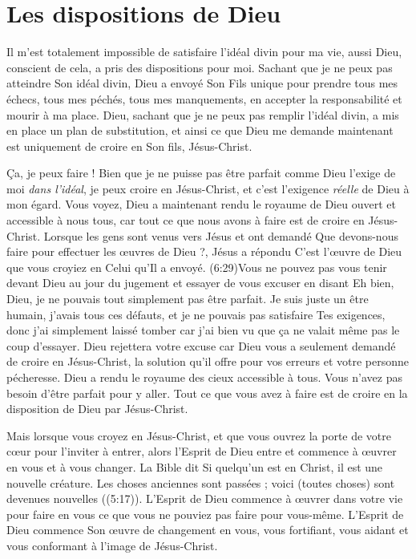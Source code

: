 \section{Les dispositions de Dieu}

Il m'est totalement impossible de satisfaire l'idéal divin
 pour ma vie, aussi Dieu, conscient de cela, a pris
 des dispositions pour moi.
 Sachant que je ne peux pas atteindre Son idéal divin,
 Dieu a envoyé Son Fils unique pour prendre tous mes échecs,
 tous mes péchés, tous mes manquements, en accepter la responsabilité
 et mourir à ma place.
 Dieu, sachant que je ne peux pas remplir l'idéal divin,
 a mis en place un plan de substitution, et ainsi ce que Dieu
 me demande maintenant est uniquement de croire en Son fils, Jésus-Christ.

Ça, je peux faire !
 Bien que je ne puisse pas être parfait
 comme Dieu l'exige de moi \emph{dans l'idéal},
 je peux croire en Jésus-Christ,
 et c'est l'exigence \emph{réelle} de Dieu à mon égard.
 Vous voyez, Dieu a maintenant rendu le royaume de Dieu ouvert
 et accessible à nous tous, car tout ce que nous avons à faire
 est de croire en Jésus-Christ.
 Lorsque les gens sont venus vers Jésus et ont demandé\frcolon{}
 \Og Que devons-nous faire pour effectuer les œuvres de Dieu ?\Fg{},
 Jésus a répondu\frcolon{}
 \Og C'est l'œuvre de Dieu que vous croyiez en Celui qu'Il a envoyé. \Fg{}
 (6:29)Vous ne pouvez pas vous tenir devant Dieu au jour du jugement
 et essayer de vous excuser en disant\frcolon{}
 \Og Eh bien, Dieu, je ne pouvais tout simplement pas être parfait.
 Je suis juste un être humain, j'avais tous ces défauts,
 et je ne pouvais pas satisfaire Tes exigences,
 donc j'ai simplement laissé tomber car j'ai bien vu
 que ça ne valait même pas le coup d'essayer. \Fg{}
 Dieu rejettera votre excuse car Dieu vous a seulement demandé
 de croire en Jésus-Christ, la solution qu'il offre pour vos erreurs
 et votre personne pécheresse.
 Dieu a rendu le royaume des cieux accessible à tous.
 Vous n'avez pas besoin d'être parfait pour y aller.
 Tout ce que vous avez à faire est de croire en la disposition
 de Dieu par Jésus-Christ.

Mais lorsque vous croyez en Jésus-Christ,
 et que vous ouvrez la porte de votre cœur
 pour l'inviter à entrer,
 alors l'Esprit de Dieu entre et commence à œuvrer en vous
 et à vous changer.
 La Bible dit\frcolon{}
 \Og Si quelqu'un est en Christ, il est une nouvelle créature.
 Les choses anciennes sont passées ; voici\frcolon{} (toutes choses)
 sont devenues nouvelles \Fg{} ((5:17)).
 L'Esprit de Dieu commence à œuvrer dans votre vie pour faire
 en vous ce que vous ne pouviez pas faire pour vous-même.
 L'Esprit de Dieu commence Son œuvre de changement en vous,
 vous fortifiant, vous aidant et vous conformant à l'image de Jésus-Christ.


